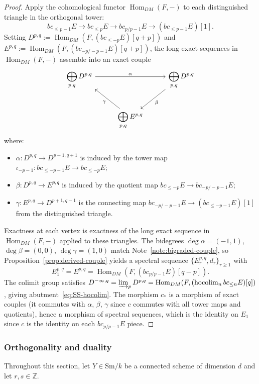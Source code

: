 \documentclass[12pt,a4paper]{article}
\theoremstyle{definition}
\newcommand{\Sm}{\mathrm{Sm}}
\newcommand{\hocolim}{\operatorname*{hocolim}}
\newcommand{\Hom}{\operatorname{Hom}}
\newcommand{\Z}{\mathbb{Z}}
\begin{document}
\begin{proof}
Apply the cohomological functor $\Hom_{DM}(F,-)$ to each distinguished triangle
in the orthogonal tower:
\[
  bc_{\leq p-1}E \longrightarrow bc_{\leq p}E \longrightarrow bc_{p/p-1}E
  \longrightarrow (bc_{\leq p-1}E)[1].
\]
Setting $D^{p,q}:=\Hom_{DM}(F,(bc_{\leq -p}E)[q+p])$ and
$E^{p,q}:=\Hom_{DM}(F,(bc_{-p/-p-1}E)[q+p])$, the long exact sequences in
$\Hom_{DM}(F,-)$ assemble into an exact couple
\[
\begin{tikzcd}[column sep=2.8em,row sep=2em]
  \displaystyle\bigoplus_{p,q} D^{p,q}
    \ar[rr,"\alpha"] &&
  \displaystyle\bigoplus_{p,q} D^{p,q}
    \ar[dl,"\beta"] \\[6pt]
  & \displaystyle\bigoplus_{p,q} E^{p,q}
    \ar[ul,"\gamma"] &
\end{tikzcd}
\]
where:
\begin{itemize}
  \item $\alpha:D^{p,q}\to D^{p-1,q+1}$ is induced by the tower map
    $\iota_{-p-1}:bc_{\leq -p-1}E\to bc_{\leq -p}E$;
  \item $\beta:D^{p,q}\to E^{p,q}$ is induced by the quotient map
    $bc_{\leq -p}E\to bc_{-p/-p-1}E$;
  \item $\gamma:E^{p,q}\to D^{p+1,q-1}$ is the connecting map
    $bc_{-p/-p-1}E\to (bc_{\leq -p-1}E)[1]$ from the distinguished triangle.
\end{itemize}
Exactness at each vertex is exactness of the long exact sequence in $\Hom_{DM}(F,-)$
applied to these triangles.  The bidegrees $\deg\alpha=(-1,1)$, $\deg\beta=(0,0)$,
$\deg\gamma=(1,0)$ match Note~\ref{note:bigraded-couple}, so
Proposition~\ref{prop:derived-couple} yields a spectral sequence
$\{E_r^{p,q},d_r\}_{r\geq 1}$ with
\[
  E_1^{p,q} = E^{p,q} = \Hom_{DM}(F,(bc_{p/p-1}E)[q-p]).
\]
The colimit group satisfies $D^{-\infty,q}=\varinjlim_p D^{p,q}
=\Hom_{DM}(F,(\hocolim_n bc_{\leq n}E)[q])$, giving abutment~\eqref{eq:SS-hocolim}.
The morphism $c_*$ is a morphism of exact couples (it commutes with $\alpha$, $\beta$,
$\gamma$ since $c$ commutes with all tower maps and quotients), hence a morphism of
spectral sequences, which is the identity on $E_1$ since $c$ is the identity on each
$bc_{p/p-1}E$ piece.
\end{proof}

\subsubsection{Orthogonality and duality}

Throughout this section, let $Y\in\Sm/k$ be a connected scheme of dimension $d$ and
let $r,s\in\Z$.
\end{document}
